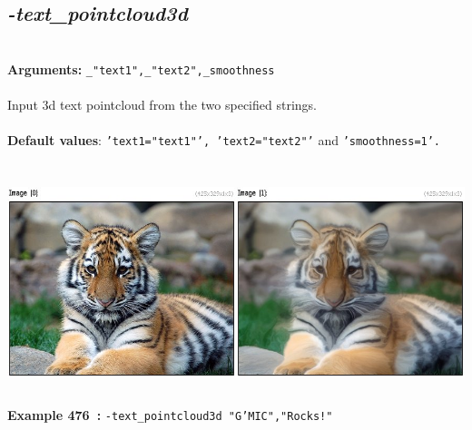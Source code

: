 \documentclass[a4paper,11pt,twoside]{book}
\begin{document}
\subsection{\emph{-text\_pointcloud3d} }\vspace*{-0.5em}
~\\\textbf{Arguments: } 
{\small \texttt{\_"text1",\_"text2",\_smoothness}}\\~\\
Input 3d text pointcloud from the two specified strings.
~\\~\\\textbf{Default values}: {\small \texttt{'text1="text1"', 'text2="text2"'} and \texttt{'smoothness=1'.}}
\begin{center}\includegraphics[keepaspectratio=true,height=7cm,width=\textwidth]{img/gmic_def476.jpg}\\
{\footnotesize \textbf{Example 476~:} \texttt{-text\_pointcloud3d "G'MIC","Rocks!"}}
\end{center}
\end{document}
